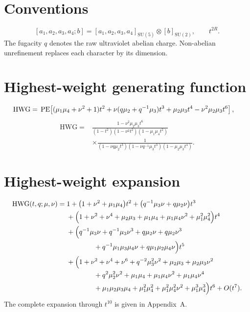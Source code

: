 \documentclass[11pt]{article}
\begin{document}
\MakeQFFFTitle

\section{Conventions}
\[
[a_1,a_2,a_3,a_4;b]
=[a_1,a_2,a_3,a_4]_{\mathrm{SU}(5)}\otimes[b]_{\mathrm{SU}(2)},
\qquad t^{2R}.
\]
The fugacity $q$ denotes the raw ultraviolet abelian charge.  Non-abelian unrefinement replaces each character by its dimension.

\section{Highest-weight generating function}
\begin{align}
\mathrm{HWG}
={}&\operatorname{PE}\!\left[(\mu_1\mu_4+\nu^2+1)t^2
+\nu(q\mu_2+q^{-1}\mu_3)t^3
+\mu_2\mu_3t^4-\nu^2\mu_2\mu_3t^6\right],
\label{eq:hwg-pe}
\end{align}
\begin{align}
\mathrm{HWG}
={}&\frac{1-\nu^2\mu_2\mu_3t^6}
{(1-t^2)(1-\nu^2t^2)(1-\mu_1\mu_4t^2)}
\nonumber\\[-1mm]
&\times\frac{1}
{(1-\nu q\mu_2t^3)(1-\nu q^{-1}\mu_3t^3)(1-\mu_2\mu_3t^4)}.
\label{eq:hwg-rational}
\end{align}

\section{Highest-weight expansion}
\begin{align*}
\mathrm{HWG}(t,q;\mu,\nu)={}&1
+\bigl(1+\nu^2+\mu_1\mu_4\bigr)t^2
+\bigl(q^{-1}\mu_3\nu+q\mu_2\nu\bigr)t^3\\
&+\Bigl(1+\nu^2+\nu^4+\mu_2\mu_3+\mu_1\mu_4
 +\mu_1\mu_4\nu^2+\mu_1^2\mu_4^2\Bigr)t^4\\
&+\Bigl(q^{-1}\mu_3\nu+q^{-1}\mu_3\nu^3
 +q\mu_2\nu+q\mu_2\nu^3\\
&\hspace{1.4cm}+q^{-1}\mu_1\mu_3\mu_4\nu
 +q\mu_1\mu_2\mu_4\nu\Bigr)t^5\\
&+\Bigl(1+\nu^2+\nu^4+\nu^6+q^{-2}\mu_3^2\nu^2
 +\mu_2\mu_3+\mu_2\mu_3\nu^2\\
&\hspace{1.4cm}+q^2\mu_2^2\nu^2+\mu_1\mu_4
 +\mu_1\mu_4\nu^2+\mu_1\mu_4\nu^4\\
&\hspace{1.4cm}+\mu_1\mu_2\mu_3\mu_4+\mu_1^2\mu_4^2
 +\mu_1^2\mu_4^2\nu^2+\mu_1^3\mu_4^3\Bigr)t^6
+O(t^7).
\end{align*}
The complete expansion through $t^{10}$ is given in Appendix~A.
\end{document}
